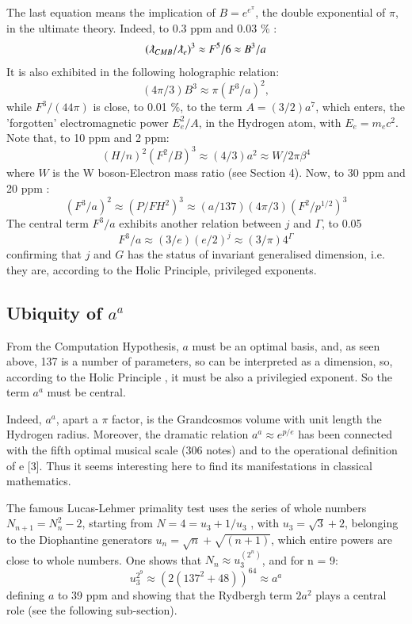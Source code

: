 \documentclass[twoside,draft]{article}
\begin{document}
\begin{sloppypar}
{The last equation means the implication of $B = e^{e^{\pi}}$, the double exponential of $\pi$, in the ultimate theory. Indeed, to 0.3 ppm and 0.03 \% :
\begin{equation}
(\lambdabar_{CMB}/\lambdabar_e)^3 \approx F^5/6 \approx B^3/a
\end{equation}
It is also exhibited in the following holographic relation:
\begin{equation}
(4\pi/3) B^3 \approx \pi(F^3/a)^2,
\end{equation}
while $F^3/(44\pi)$ is close, to 0.01 \%, to the term $A = (3/2) a^7$, which enters, the 'forgotten' electromagnetic power $E_e^2/A$, in the Hydrogen atom, with $E_e = m_ec^2$.
Note that, to 10 ppm and 2 ppm:
\begin{equation}
(H/n)^2(F^2/B)^3 \approx (4/3) a^2 \approx W/2\pi \beta^4
\end{equation}
where $W$ is the W boson-Electron mass ratio (see Section 4). Now, to 30 ppm and 20 ppm :  
\begin{equation}
 (F^3/a)^2 \approx (P/FH^2)^3  \approx  (a/137)(4\pi/3)(F^2/p^{1/2})^3 
\end{equation}
The central term $F^3/a$ exhibits another relation between $j$ and $\Gamma$, to 0.05 %
\begin{equation}
F^3/a \approx (3/e)(e/2)^j  \approx (3/\pi) 4^{\Gamma}
\end{equation}
confirming that $j$ and $G$ has the status of invariant generalised dimension, i.e. they are, according to the Holic Principle, privileged exponents.

\subsection{Ubiquity of $a^{a}$}

From the Computation Hypothesis, $a$ must be an optimal basis, and, as seen above, 137 is a number of parameters, so can be interpreted as a dimension, so, according to the Holic Principle , it must be also a privilegied exponent. So the term $a^a$ must be central.
    
Indeed, $a^a$, apart a $\pi$ factor, is the Grandcosmos volume with unit length the Hydrogen radius. Moreover, the dramatic relation $a^a\approx e^{p/e}$ has been connected with the fifth optimal musical scale (306 notes) and to the operational definition of e [3]. Thus it seems interesting here to find its manifestations in classical mathematics. 

The famous Lucas-Lehmer primality test uses the series of whole numbers $N_{n+1} = N_{n}^{2}-2$,
starting from $N = 4 = u_{3} + 1/u_{3}$ , with $u_{3} = \sqrt{3} + 2$, belonging to the Diophantine generators $u_{n} = \sqrt{n} + \sqrt{(n+1)}$, which entire powers are close to whole numbers. One shows that $N_{n} \approx u_{3}^{(2^{n})}$, and for n = 9:
\begin{equation}
u_{3}^{2^9} \approx (2(137^{2} + 48))^{64} \approx a^{a}
\end{equation}
defining $a$ to 39 ppm and showing that the Rydbergh term $2a^2$ plays a central role (see the following sub-section).

}
\end{sloppypar}
\end{document}

